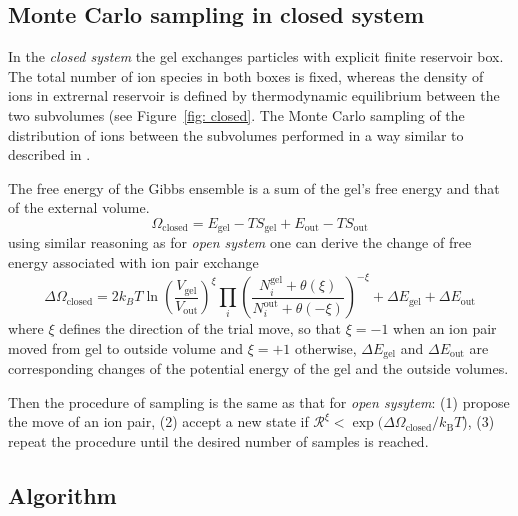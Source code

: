 \documentclass[journal,article,submit,pdftex,moreauthors]{Definitions/mdpi}
\newcommand{\kT}{k_\mathrm{B}T}
\newcommand{\gel}{^\mathrm{gel}}
\newcommand{\out}{^{\mathrm{out}}}
\newcommand{\Vgel}{V_\mathrm{gel}}
\newcommand{\Egel}{E_\mathrm{gel}}
\newcommand{\Sgel}{S_\mathrm{gel}}
\newcommand{\Vout}{V_\mathrm{out}}
\newcommand{\Eout}{E_\mathrm{out}}
\newcommand{\Sout}{S_\mathrm{out}}
\newcommand{\reffig}[1]{Figure~\ref{#1}}
\begin{document}
\subsection{Monte Carlo sampling in closed system}

In the \emph{closed system} the gel exchanges particles with explicit finite reservoir box. 
The total number of ion species in both boxes is fixed, whereas the density of ions in extrernal reservoir is defined by thermodynamic equilibrium between the two subvolumes (see \reffig{fig: closed}. The Monte Carlo sampling of the distribution of ions between the subvolumes performed in a way similar to described in \cite{Panagiotopoulos1988b, Erdos2020}. 

The free energy of the Gibbs ensemble is a sum of the gel's free energy and that of the external volume.
\begin{equation}
    \Omega_{\mathrm{closed}}=\Egel-T\Sgel + \Eout-T\Sout \label{eq:Omega-GC}
\end{equation}
using similar reasoning as for \emph{open system} one can derive the change of free energy associated with ion pair exchange 
\begin{equation}
\Delta \Omega_{\mathrm{closed}} =2 k_B T \ln \left(\frac{\Vgel}{\Vout} \right) ^ {\xi}\prod_i \left(\frac{N_{i}\gel+\theta(\xi)}{N_{i}\out+\theta(-\xi)}\right)^{-\xi} + \Delta \Egel + \Delta \Eout
\end{equation}
where $\xi$ defines the direction of the trial move, so that $\xi = -1$ when an ion pair moved from gel to outside volume and  $\xi = +1$ otherwise, $\Delta \Egel$ and $\Delta \Eout$ are corresponding changes of the potential energy of the gel and the outside volumes.

Then the procedure of sampling is the same as that for \emph{open sysytem}: (1) propose the move of an ion pair, (2) accept a new state if $\mathcal{R}^{\xi}<\exp({\Delta\Omega_\mathrm{closed}/\kT}$), (3) repeat the procedure until the desired number of samples is reached.

\subsection{Algorithm}
\end{document}
